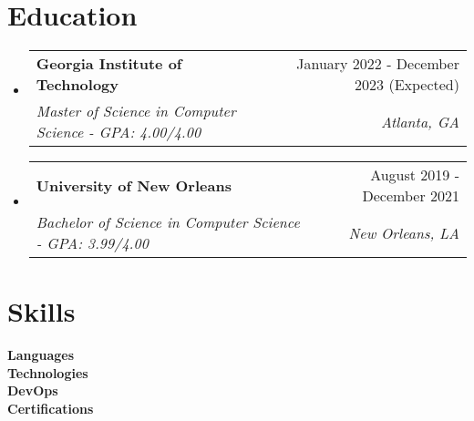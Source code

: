 \documentclass[letterpaper,11pt]{article}
\makeatletter
\newcommand{\resumeItem}[1]{
  \item\small{
    {#1 \vspace{-2pt}}
  }
}
\newcommand{\resumeSubheading}[4]{
  \vspace{-2pt}\item
    \begin{tabular*}{0.97\textwidth}[t]{l@{\extracolsep{\fill}}r}
      \textbf{#1} & #2 \\
      \textit{\small#3} & \textit{\small #4} \\
    \end{tabular*}\vspace{-7pt}
}
\newcommand{\resumeSubHeadingListStart}{\begin{itemize}[leftmargin=0.15in, label={}]}
\newcommand{\resumeSubHeadingListEnd}{\end{itemize}}
\newcommand{\resumeItemListStart}{\begin{itemize}}
\newcommand{\resumeItemListEnd}{\end{itemize}\vspace{-5pt}}
\makeatother
\begin{document}
\section{Education}
  \resumeSubHeadingListStart
    \resumeSubheading
      {Georgia Institute of Technology}{January 2022 - December 2023 (Expected)}
      {Master of Science in Computer Science - GPA: 4.00/4.00}{Atlanta, GA}
        
    \resumeSubheading
      {University of New Orleans}{August 2019 - December 2021}
      {Bachelor of Science in Computer Science - GPA: 3.99/4.00}{New Orleans, LA}
  \resumeSubHeadingListEnd
  

%
\section{Skills}
 \begin{itemize}[leftmargin=0.15in, label={}]
    \small{\item{
     \textbf{Languages}\hspace*{1cm}{Python, Java, HTML, CSS, JavaScript, SQL} \\
     \textbf{Technologies}\hspace*{0.6cm}{Git, Unity, Jupyter Notebook} \\
     \textbf{DevOps}\hspace*{1.4cm}{Amazon Web Services (AWS), Terraform, GitHub Actions} \\
     \textbf{Certifications}\hspace*{0.4cm}{AWS Solutions Architect - Associate, AWS Cloud Practitioner} 
    }}
 \end{itemize}

\end{document}
